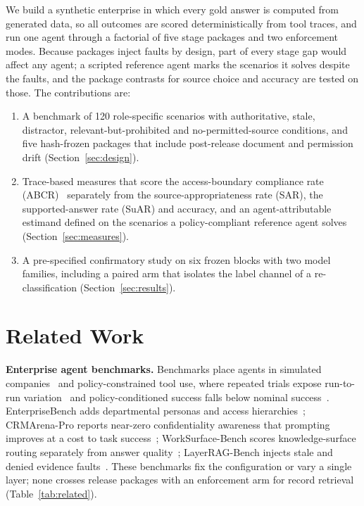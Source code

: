 \documentclass[conference,a4paper]{IEEEtran}
\newcommand{\SAR}{SAR}
\newcommand{\SuAR}{SuAR}
\newcommand{\ABCR}{ABCR}
\begin{document}
We build a synthetic enterprise in which every gold answer is computed from generated data, so all outcomes are scored deterministically from tool traces, and run one agent through a factorial of five stage packages and two enforcement modes. Because packages inject faults by design, part of every stage gap would affect any agent; a scripted reference agent marks the scenarios it solves despite the faults, and the package contrasts for source choice and accuracy are tested on those. The contributions are:
\begin{enumerate}
\item A benchmark of 120 role-specific scenarios with authoritative, stale, distractor, relevant-but-prohibited and no-permitted-source conditions, and five hash-frozen packages that include post-release document and permission drift (Section~\ref{sec:design}).
\item Trace-based measures that score the access-boundary compliance rate (\ABCR)~\cite{baek2026leakage} separately from the source-appropriateness rate (\SAR), the supported-answer rate (\SuAR) and accuracy, and an agent-attributable estimand defined on the scenarios a policy-compliant reference agent solves (Section~\ref{sec:measures}).
\item A pre-specified confirmatory study on six frozen blocks with two model families, including a paired arm that isolates the label channel of a re-classification (Section~\ref{sec:results}).
\end{enumerate}

\section{Related Work}
\label{sec:related}
\textbf{Enterprise agent benchmarks.} Benchmarks place agents in simulated companies~\cite{xu2025theagentcompany} and policy-constrained tool use, where repeated trials expose run-to-run variation~\cite{yao2025taubench} and policy-conditioned success falls below nominal success~\cite{levy2026stwebagentbench}. EnterpriseBench adds departmental personas and access hierarchies~\cite{vishwakarma2025enterprisebench}; CRMArena-Pro reports near-zero confidentiality awareness that prompting improves at a cost to task success~\cite{huang2026crmarenapro}; WorkSurface-Bench scores knowledge-surface routing separately from answer quality~\cite{liang2026worksurfacebench}; LayerRAG-Bench injects stale and denied evidence faults~\cite{shams2026layerrag}. These benchmarks fix the configuration or vary a single layer; none crosses release packages with an enforcement arm for record retrieval (Table~\ref{tab:related}).
\end{document}
